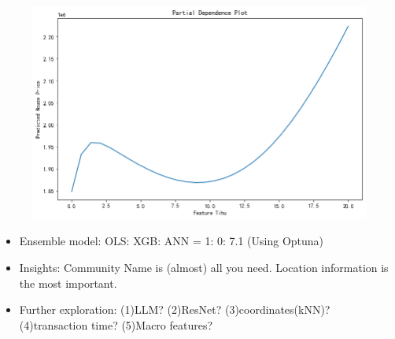 \documentclass{beamer}
\begin{document}
\begin{frame}
\begin{minipage}[t]{0.32\textwidth}
\begin{figure}
            \end{figure}
            \begin{figure}
                \includegraphics[width=\linewidth]{figure/pdp_tihu_val.png}
            \end{figure}
        \end{minipage}
    \begin{itemize}
        \small
        \item Ensemble model: OLS: XGB: ANN = 1: 0: 7.1 (Using Optuna)
        \item Insights: Community Name is (almost) all you need. Location information is the most important.
        \item Further exploration: (1)LLM? (2)ResNet? (3)coordinates(kNN)? (4)transaction time? (5)Macro features?
    \end{itemize}
\end{frame}
\end{document}
